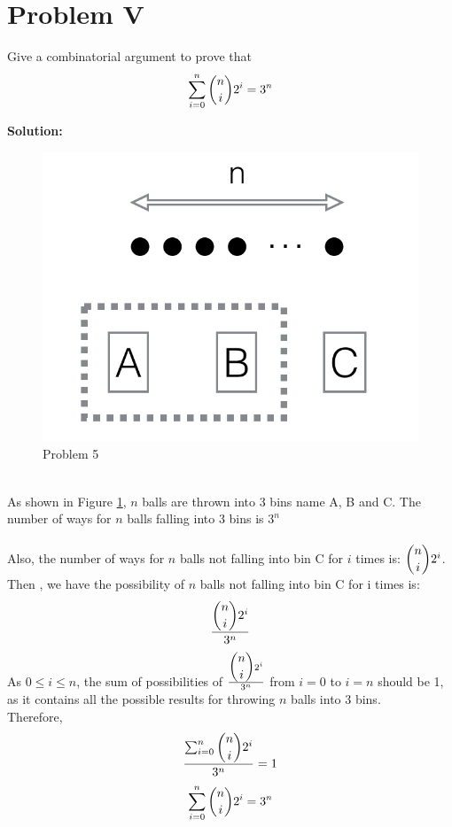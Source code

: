 \section{Problem V}
Give a combinatorial argument to prove that
$$ \sum_{i=0}^{n}\dbinom{n}{i}2^{i} = 3^n $$

\textbf{Solution:} \\
\begin{figure}[h]
\centering
\includegraphics[scale=0.25]{p5img}
\caption{Problem 5}
\label{fig:p5}
\end{figure}\\

As shown in Figure \ref{fig:p5}, $n$ balls are thrown into 3 bins name A, B and C. The number of ways for $n$ balls falling into 3 bins is $3^n$ \\
\\
Also, the number of ways for $n$ balls not falling into bin C for $i$ times is: $\dbinom{n}{i} 2^{i}$. Then , we have the possibility of $n$ balls not falling into bin C for i times is:
$$\frac{\dbinom{n}{i} 2^{i}}{3^n}$$
As $0 \leq i \leq n$, the sum of possibilities of $\frac{\dbinom{n}{i} 2^{i}}{3^n}$ from $i = 0$ to $i = n$ should be 1, as it contains all the possible results for throwing $n$ balls into 3 bins.\\
Therefore,
$$ \frac{\sum_{i=0}^{n}\dbinom{n}{i}2^{i}}{3^n} = 1$$
$$\sum_{i=0}^{n}\dbinom{n}{i}2^{i} = 3^n$$